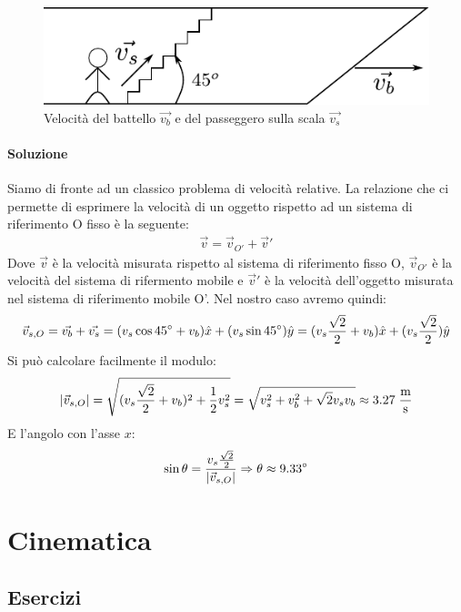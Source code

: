 \documentclass[12pt,a4paper]{book}
\begin{document}
\begin{figure}[!ht]
\centering
\includegraphics[scale=1]{boat.pdf}
\caption{Velocità del battello $\vec{v_b}$ e del passeggero sulla scala $\vec{v_s}$ \label{fig:boat} }
\end{figure}

\subsubsection*{Soluzione}
Siamo di fronte ad un classico problema di velocità relative. La relazione che ci permette di esprimere la velocità di un oggetto rispetto ad un sistema di riferimento O fisso è la seguente:
%
\begin{gather*}
\vec{v}=\vec{v}_{O'}+\vec{v}'
\end{gather*}
%
Dove $\vec{v}$ è la velocità misurata rispetto al sistema di riferimento fisso O, $\vec{v}_{O'}$ è la velocità del sistema di rifermento mobile e $\vec{v}'$ è la velocità dell'oggetto misurata nel sistema di riferimento mobile O'. Nel nostro caso avremo quindi:
%
\begin{gather*}
\vec{v}_{s,O}=\vec{v_b}+\vec{v_s}=(v_s\cos45\degree+v_b)\hat{x}+(v_s\sin45\degree)\hat{y}=(v_s\frac{\sqrt{2}}{2}+v_b)\hat{x}+(v_s\frac{\sqrt{2}}{2})\hat{y}
\end{gather*}
%
Si può calcolare facilmente il modulo:
%
\begin{gather*}
\qty|\vec{v}_{s,O}|=\sqrt{(v_s\frac{\sqrt{2}}{2}+v_b)^2+\frac{1}{2}v_s^2}=\sqrt{v_s^2+v_b^2+\sqrt{2}v_s v_b} \approx 3.27\;\frac{\text{m}}{\text{s}}
\end{gather*}
%
E l'angolo con l'asse $x$:
%
\begin{gather*}
\sin\theta=\frac{v_s\frac{\sqrt{2}}{2}}{\qty|\vec{v}_{s,O}|} \Rightarrow \theta\approx 9.33\degree
\end{gather*}
%


\chapter{Cinematica}
\section{Esercizi}
\end{document}
